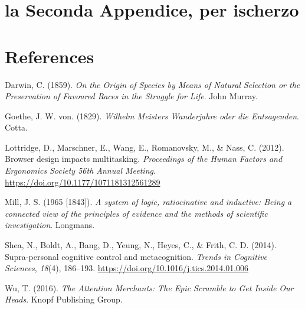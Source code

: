 \documentclass[a4paper, 11pt, nobind]{templates/ociamthesis}
\newlength{\cslhangindent}
\newenvironment{CSLReferences}[2] %
 {%
  \setlength{\parindent}{0pt}
  \ifodd #1
  \let\oldpar\par
  \def\par{\hangindent=\cslhangindent\oldpar}
  \fi
  \setlength{\parskip}{1mm}
  \setlength{\baselineskip}{6mm}
 }%
 {}
\begin{document}
\hypertarget{la-seconda-appendice-per-ischerzo}{%
\chapter{la Seconda Appendice, per ischerzo}\label{la-seconda-appendice-per-ischerzo}}

\hypertarget{references}{%
\chapter*{References}\label{references}}

\hypertarget{refs}{}
\begin{CSLReferences}{1}{0}
\leavevmode{}%
Darwin, C. (1859). \emph{{On the Origin of Species by Means of Natural Selection or the Preservation of Favoured Races in the Struggle for Life}}. John Murray.

\leavevmode{}%
Goethe, J. W. von. (1829). \emph{Wilhelm {Meisters} {Wanderjahre} oder die {Entsagenden}}. Cotta.

\leavevmode{}%
Lottridge, D., Marschner, E., Wang, E., Romanovsky, M., \& Nass, C. (2012). {Browser design impacts multitasking}. \emph{Proceedings of the Human Factors and Ergonomics Society 56th Annual Meeting}. \url{https://doi.org/10.1177/1071181312561289}

\leavevmode{}%
Mill, J. S. (1965 {[}1843{]}). \emph{A system of logic, ratiocinative and inductive: Being a connected view of the principles of evidence and the methods of scientific investigation}. Longmans.

\leavevmode{}%
Shea, N., Boldt, A., Bang, D., Yeung, N., Heyes, C., \& Frith, C. D. (2014). {Supra-personal cognitive control and metacognition}. \emph{Trends in Cognitive Sciences}, \emph{18}(4), 186--193. \url{https://doi.org/10.1016/j.tics.2014.01.006}

\leavevmode{}%
Wu, T. (2016). \emph{{The Attention Merchants: The Epic Scramble to Get Inside Our Heads}}. Knopf Publishing Group.

\end{CSLReferences}

\end{document}
